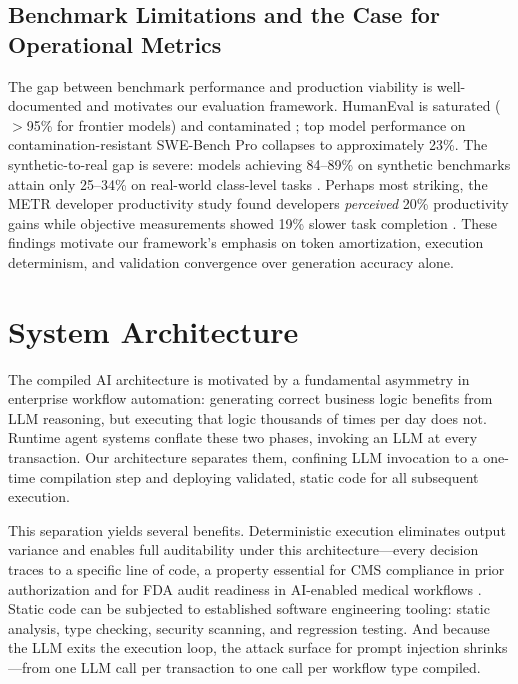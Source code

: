 \documentclass[11pt]{article}
\begin{document}
\subsection{Benchmark Limitations and the Case for Operational Metrics}
\label{sec:related-benchmarks}

The gap between benchmark performance and production viability is well-documented and motivates our evaluation framework. HumanEval is saturated ($>$95\% for frontier models) and contaminated \citep{yang2023rethinking, xu2024contamination}; top model performance on contamination-resistant SWE-Bench Pro collapses to approximately 23\%. The synthetic-to-real gap is severe: models achieving 84--89\% on synthetic benchmarks attain only 25--34\% on real-world class-level tasks \citep{rao2025synthetic}. Perhaps most striking, the METR developer productivity study found developers \emph{perceived} 20\% productivity gains while objective measurements showed 19\% slower task completion \citep{metr2025productivity}. These findings motivate our framework's emphasis on token amortization, execution determinism, and validation convergence over generation accuracy alone.

\section{System Architecture}
\label{sec:architecture}

The compiled AI architecture is motivated by a fundamental asymmetry in enterprise workflow automation: generating correct business logic benefits from LLM reasoning, but executing that logic thousands of times per day does not. Runtime agent systems conflate these two phases, invoking an LLM at every transaction. Our architecture separates them, confining LLM invocation to a one-time compilation step and deploying validated, static code for all subsequent execution.

This separation yields several benefits. Deterministic execution eliminates output variance and enables full auditability under this architecture---every decision traces to a specific line of code, a property essential for CMS compliance in prior authorization and for FDA audit readiness in AI-enabled medical workflows \citep{fda2025}. Static code can be subjected to established software engineering tooling: static analysis, type checking, security scanning, and regression testing. And because the LLM exits the execution loop, the attack surface for prompt injection shrinks---from one LLM call per transaction to one call per workflow type compiled.
\end{document}
